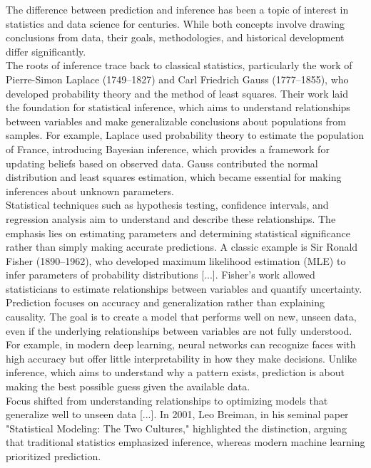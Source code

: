 \documentclass{book}
\begin{document}
The difference between prediction and inference has been a topic of interest in statistics and data science for centuries. While both concepts involve drawing conclusions from data, their goals, methodologies, and historical development differ significantly.\\

The roots of inference trace back to classical statistics, particularly the work of Pierre-Simon Laplace (1749–1827) and Carl Friedrich Gauss (1777–1855), who developed probability theory and the method of least squares. Their work laid the foundation for statistical inference, which aims to understand relationships between variables and make generalizable conclusions about populations from samples. For example, Laplace used probability theory to estimate the population of France, introducing Bayesian inference, which provides a framework for updating beliefs based on observed data. Gauss contributed the normal distribution and least squares estimation, which became essential for making inferences about unknown parameters.\\

Statistical techniques such as hypothesis testing, confidence intervals, and regression analysis aim to understand and describe these relationships. The emphasis lies on estimating parameters and determining statistical significance rather than simply making accurate predictions. A classic example is Sir Ronald Fisher (1890–1962), who developed maximum likelihood estimation (MLE) to infer parameters of probability distributions [...]. Fisher’s work allowed statisticians to estimate relationships between variables and quantify uncertainty.\\

Prediction focuses on accuracy and generalization rather than explaining causality. The goal is to create a model that performs well on new, unseen data, even if the underlying relationships between variables are not fully understood. For example, in modern deep learning, neural networks can recognize faces with high accuracy but offer little interpretability in how they make decisions. Unlike inference, which aims to understand why a pattern exists, prediction is about making the best possible guess given the available data.\\

Focus shifted from understanding relationships to optimizing models that generalize well to unseen data [...]. In 2001, Leo Breiman, in his seminal paper "Statistical Modeling: The Two Cultures," highlighted the distinction, arguing that traditional statistics emphasized inference, whereas modern machine learning prioritized prediction.\\
\end{document}
